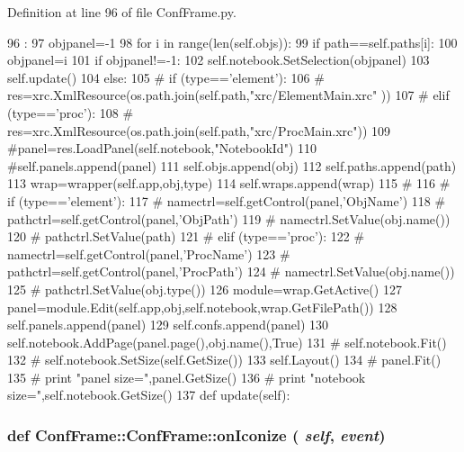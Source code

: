 Definition at line 96 of file ConfFrame.py.


\begin{DoxyCode}
96                                      :
97         objpanel=-1
98         for i in range(len(self.objs)):
99             if path==self.paths[i]:
100                 objpanel=i
101         if objpanel!=-1:
102             self.notebook.SetSelection(objpanel)
103             self.update()
104         else:
105 #            if (type=='element'):
106 #                res=xrc.XmlResource(os.path.join(self.path,"xrc/ElementMain.xrc"
      ))
107 #            elif (type=='proc'):
108 #                res=xrc.XmlResource(os.path.join(self.path,"xrc/ProcMain.xrc"))
109             #panel=res.LoadPanel(self.notebook,"NotebookId")
110             #self.panels.append(panel)
111             self.objs.append(obj)
112             self.paths.append(path)
113             wrap=wrapper(self.app,obj,type)
114             self.wraps.append(wrap)
115 #            
116 #            if (type=='element'):
117 #                namectrl=self.getControl(panel,'ObjName')
118 #                pathctrl=self.getControl(panel,'ObjPath')
119 #                namectrl.SetValue(obj.name())
120 #                pathctrl.SetValue(path)
121 #            elif (type=='proc'):
122 #                namectrl=self.getControl(panel,'ProcName')
123 #                pathctrl=self.getControl(panel,'ProcPath')
124 #                namectrl.SetValue(obj.name())
125 #                pathctrl.SetValue(obj.type())
126             module=wrap.GetActive()
127             panel=module.Edit(self.app,obj,self.notebook,wrap.GetFilePath())
128             self.panels.append(panel)
129             self.confs.append(panel)
130             self.notebook.AddPage(panel.page(),obj.name(),True)
131 #            self.notebook.Fit()
132 #            self.notebook.SetSize(self.GetSize())
133             self.Layout()
134 #            panel.Fit()
135 #            print "panel size=",panel.GetSize()
136 #            print "notebook size=",self.notebook.GetSize()
137             
    def update(self):
\end{DoxyCode}
\hypertarget{classConfFrame_1_1ConfFrame_a01aaecf1b7070b1152dbcd6d77fac983}{
\subsubsection[{onIconize}]{\setlength{\rightskip}{0pt plus 5cm}def ConfFrame::ConfFrame::onIconize ( {\em self}, \/   {\em event})}}
\label{classConfFrame_1_1ConfFrame_a01aaecf1b7070b1152dbcd6d77fac983}


